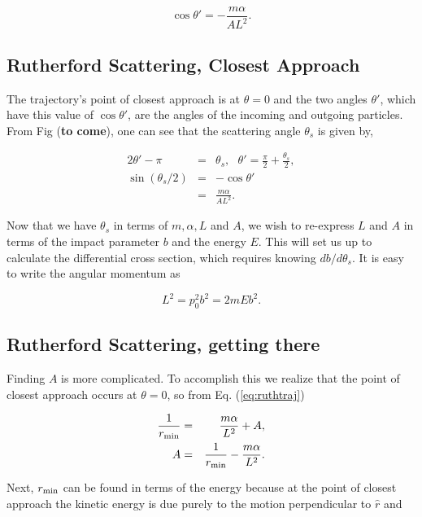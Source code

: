 \documentclass[%
oneside,                 %
final,                   %
10pt]{article}
\begin{document}
\begin{equation}
\cos\theta'=-\frac{m\alpha}{AL^2}.
\end{equation}

\subsection*{Rutherford Scattering, Closest Approach}

The trajectory's point of closest approach is at $\theta=0$ and the
two angles $\theta'$, which have this value of $\cos\theta'$, are the
angles of the incoming and outgoing particles. From
Fig (\textbf{to come}), one can see that the scattering angle
$\theta_s$ is given by,

\begin{eqnarray}
\label{eq:sthetover2}
2\theta'-\pi&=&\theta_s,~~~\theta'=\frac{\pi}{2}+\frac{\theta_s}{2},\\
\nonumber
\sin(\theta_s/2)&=&-\cos\theta'\\
\nonumber
&=&\frac{m\alpha}{AL^2}.
\end{eqnarray}

Now that we have $\theta_s$ in terms of $m,\alpha,L$ and $A$, we wish
to re-express $L$ and $A$ in terms of the impact parameter $b$ and the
energy $E$. This will set us up to calculate the differential cross
section, which requires knowing $db/d\theta_s$. It is easy to write
the angular momentum as

\begin{equation}
L^2=p_0^2b^2=2mEb^2.
\end{equation}

\subsection*{Rutherford Scattering, getting there}

Finding $A$ is more complicated. To accomplish this we realize that
the point of closest approach occurs at $\theta=0$, so from
Eq. (\ref{eq:ruthtraj})

\begin{eqnarray}
\label{eq:rminofA}
\frac{1}{r_{\rm min}}&=&\frac{m\alpha}{L^2}+A,\\
\nonumber
A&=&\frac{1}{r_{\rm min}}-\frac{m\alpha}{L^2}.
\end{eqnarray}

Next, $r_{\rm min}$ can be found in terms of the energy because at the
point of closest approach the kinetic energy is due purely to the
motion perpendicular to $\hat{r}$ and
\end{document}
